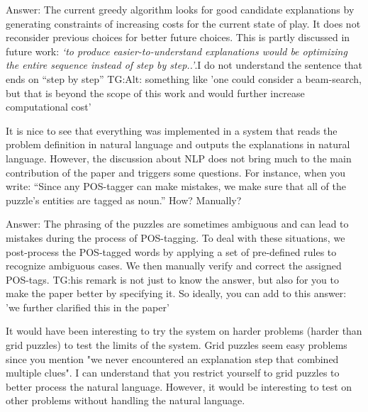 \documentclass{article}
\newcommand\comment[1]{\marginpar{\tiny #1}}
\renewcommand\comment[1]{#1}
\newcommand{\tias}[1]{{\comment{\color{blue}\textsc{TG:}#1}}}
\newcommand{\emilio}[1]{{\comment{Answer: \color{red}#1}}}
\newcommand{\bart}[1]{{\comment{\color{green}#1}}}
\begin{document}
\emilio{The current greedy algorithm looks for good candidate explanations by generating constraints of increasing costs for the current state of play. It does not reconsider previous choices for better future choices. This is partly discussed in future work: \emph{`to produce easier-to-understand explanations would be optimizing the entire sequence instead of step by step..'}.}\bart{I do not understand the sentence that ends on ``step by step''} \tias{Alt: something like 'one could consider a beam-search, but that is beyond the scope of this work and would further increase computational cost'}

\begin{quoteit}
It is nice to see that everything was implemented in a system that reads the problem definition in natural language and outputs the explanations in natural language. However, the discussion about NLP does not bring much to the main contribution of the paper and triggers some questions.
For instance, when you write: ``Since any POS-tagger can make mistakes, we make sure that all of the puzzle's entities are tagged as noun.'' How? Manually?
\end{quoteit}

\emilio{The phrasing of the puzzles are sometimes ambiguous and can lead to mistakes during the process of POS-tagging. To deal with these situations, we post-process the POS-tagged words by applying a set of pre-defined rules to recognize ambiguous cases. We then manually verify and correct the assigned POS-tags.} \tias{his remark is not just to know the answer, but also for you to make the paper better by specifying it. So ideally, you can add to this answer: 'we further clarified this in the paper'}

\begin{quoteit}
It would have been interesting to try the system on harder problems (harder than grid puzzles) to test the limits of the system.  Grid puzzles seem easy problems since you mention "we never encountered an explanation step that combined multiple clues".  I can understand that you restrict yourself to grid puzzles to better process the natural language. However, it would be interesting to test on other problems without handling the natural language.
\end{quoteit}
\end{document}
